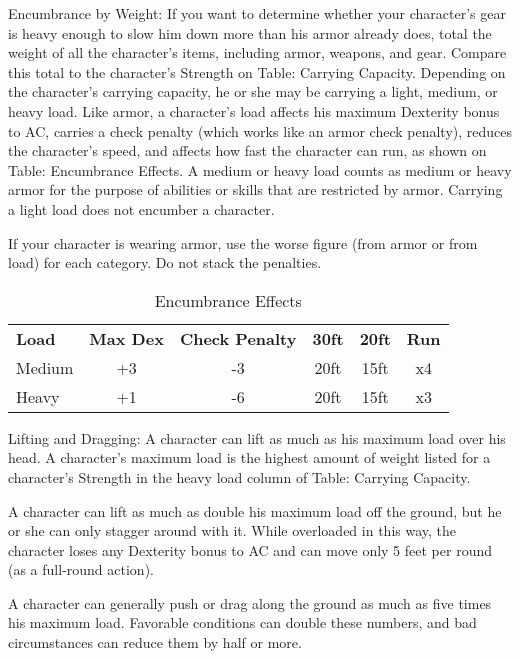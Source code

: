 

Encumbrance by Weight: If you want to determine whether your character's gear is heavy enough to slow him down more than his armor already does, total the weight of all the character's items, including armor, weapons, and gear. Compare this total to the character's Strength on Table: Carrying Capacity. Depending on the character's carrying capacity, he or she may be carrying a light, medium, or heavy load. Like armor, a character's load affects his maximum Dexterity bonus to AC, carries a check penalty (which works like an armor check penalty), reduces the character's speed, and affects how fast the character can run, as shown on Table: Encumbrance Effects. A medium or heavy load counts as medium or heavy armor for the purpose of abilities or skills that are restricted by armor. Carrying a light load does not encumber a character.
				
If your character is wearing armor, use the worse figure (from armor or from load) for each category. Do not stack the penalties.


\begin{table}[htb]
\sffamily
{}
\caption{Encumbrance Effects}
\centering
\begin{tabular}{l c c c c c}
\textbf{Load} & \textbf{Max Dex} & \textbf{Check Penalty} & \textbf{30ft} & \textbf{20ft} & \textbf{Run}\\
Medium & +3 & -3 & 20ft & 15ft & x4\\
Heavy & +1 & -6 & 20ft & 15ft & x3\\
\end{tabular}
\end{table}

				
Lifting and Dragging: A character can lift as much as his maximum load over his head. A character's maximum load is the highest amount of weight listed for a character's Strength in the heavy load column of Table: Carrying Capacity.
				
A character can lift as much as double his maximum load off the ground, but he or she can only stagger around with it. While overloaded in this way, the character loses any Dexterity bonus to AC and can move only 5 feet per round (as a full-round action).
				
A character can generally push or drag along the ground as much as five times his maximum load. Favorable conditions can double these numbers, and bad circumstances can reduce them by half or more.
				
